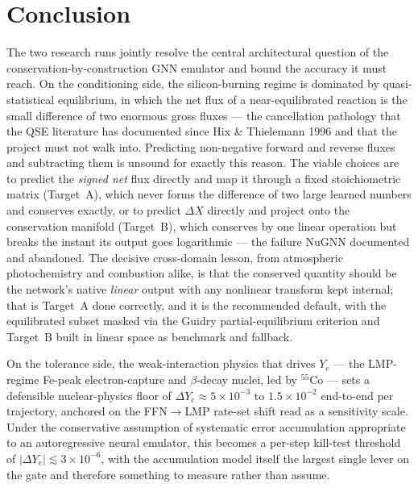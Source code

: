 \documentclass[11pt]{article}
\newcommand{\nuc}[2]{\ensuremath{{}^{#2}\mathrm{#1}}}
\begin{document}
\section{Conclusion}

The two research runs jointly resolve the central architectural question of the conservation-by-construction GNN emulator and bound the accuracy it must reach. On the conditioning side, the silicon-burning regime is dominated by quasi-statistical equilibrium, in which the net flux of a near-equilibrated reaction is the small difference of two enormous gross fluxes --- the cancellation pathology that the QSE literature has documented since Hix \& Thielemann 1996 and that the project must not walk into. Predicting non-negative forward and reverse fluxes and subtracting them is unsound for exactly this reason. The viable choices are to predict the \emph{signed net} flux directly and map it through a fixed stoichiometric matrix (Target~A), which never forms the difference of two large learned numbers and conserves exactly, or to predict $\Delta X$ directly and project onto the conservation manifold (Target~B), which conserves by one linear operation but breaks the instant its output goes logarithmic --- the failure NuGNN documented and abandoned. The decisive cross-domain lesson, from atmospheric photochemistry and combustion alike, is that the conserved quantity should be the network's native \emph{linear} output with any nonlinear transform kept internal; that is Target~A done correctly, and it is the recommended default, with the equilibrated subset masked via the Guidry partial-equilibrium criterion and Target~B built in linear space as benchmark and fallback.

On the tolerance side, the weak-interaction physics that drives $Y_e$ --- the LMP-regime Fe-peak electron-capture and $\beta$-decay nuclei, led by $\nuc{Co}{55}$ --- sets a defensible nuclear-physics floor of $\Delta Y_e \approx 5\times10^{-3}$ to $1.5\times10^{-2}$ end-to-end per trajectory, anchored on the FFN$\to$LMP rate-set shift read as a sensitivity scale. Under the conservative assumption of systematic error accumulation appropriate to an autoregressive neural emulator, this becomes a per-step kill-test threshold of $|\Delta Y_e| \lesssim 3\times10^{-6}$, with the accumulation model itself the largest single lever on the gate and therefore something to measure rather than assume.
\end{document}
